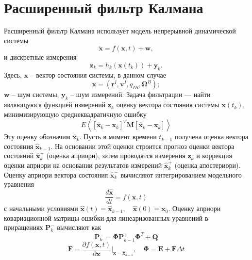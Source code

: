 \section{Расширенный фильтр Калмана}

Расширенный фильтр Калмана использует модель непрерывной динамической системы
\begin{equation} \label{eq:ekf_system}
\dot{\bm{x}} = f(\bm x, t) + \bm w,
\end{equation}
и дискретные измерения
\begin{equation} \label{eq:ekf_mes}
\bm z_k = h_k(\bm x(t_k)) + \bm y_k.
\end{equation}
Здесь, $\bm x$ -- вектор состояния системы, в данном случае
\begin{equation} \label{eq:ekf_state}
\bm x = (\bm r^I, \bm v^I, q_{IB},\bm \Omega^B);
\end{equation}
$\bm w$ -- шум системы, $\bm y_k$ -- шум измерений.
Задача фильтрации — найти являющуюся функцией измерений
$\bm z_k$
оценку вектора состояния системы
$\bm x(t_k)$,
минимизирующую среднеквадратичную ошибку
\begin{equation}
E\left\langle {{{\left[ {{{{\bm{\hat x}}}_k} - {{\bm{x}}_k}} \right]}^T}{\bm{M}}\left[ {{{{\bm{\hat x}}}_k} - {{\bm{x}}_k}} \right]} \right\rangle
\end{equation}
Эту оценку обозначим $\hat{\bm{x}}_k$.
Пусть в момент времени $t_{k-1}$ получена оценка вектора состояния
$\hat{\bm{x}}_{k-1}$.
На основании этой оценки строится прогноз оценки вектора состояний
$\hat{\bm{x}}_k^-$
(оценка априори), затем проводятся измерения
$\bm z_k$
и коррекция оценки априори на основании результатов измерений
$\hat{\bm{x}}_k^+$
(оценка апостериори). Оценку априори вектора состояния
$\hat{\bm{x}}_k^-$ вычисляют интегрированием модельного уравнения
\begin{equation}
\frac{d\hat{\bm{x}}}{dt} = f(\hat{\bm{x}}, t)
\end{equation}
с начальными условиями
$\hat{\bm{x}}(t) = \hat{\bm{x}}_{k-1}, \quad \hat{\bm{x}}(0) = \bm x_0$.
Оценку априори ковариационной матрицы ошибки для линеаризованных уравнений в приращениях
$\bm P_k^-$
вычисляют как
\begin{equation}
\bm P_k^- = \bm \Phi \bm P_{k-1}^+ \bm \Phi^{T} + \bm Q
\end{equation}
\begin{equation}
\bm F = \frac{\partial f(\bm x, t)}{\partial \bm x} \Bigg|_{\bm{x} = \hat{\bm{x}}_{k-1}}
, \quad
\bm \Phi = \bm E + \bm F \Delta t
\end{equation}

